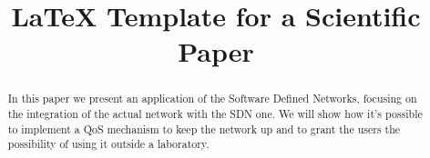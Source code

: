 \documentclass[conference,10pt]{IEEEtran}
\begin{document}
\title{LaTeX Template for a Scientific Paper}

\author{
}

\maketitle

\begin{abstract}
In this paper we present an application of the Software Defined Networks, focusing on the integration of the actual network with the SDN one.
We will show how it's possible to implement a QoS mechanism to keep the network up and to grant the users the possibility of using it outside
a laboratory.
\end{abstract}

\end{document}
